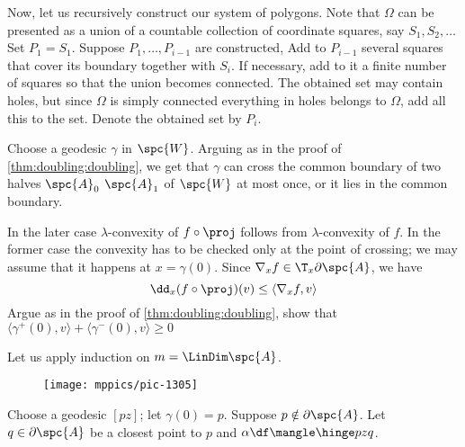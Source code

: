 Now, let us recursively construct our system of polygons.
Note that $\Omega$ can be presented as a union of a countable collection of coordinate squares, say $S_1,S_2,\dots$
Set $P_1=S_1$.
Suppose $P_1,\dots,P_{i-1}$ are constructed,
Add to $P_{i-1}$ several squares that cover its boundary together with $S_i$.
If necessary, add to it a finite number of squares so that the union becomes connected.
The obtained set may contain holes, but since $\Omega$ is simply connected everything in holes belongs to $\Omega$, add all this to the set.
Denote the obtained set by $P_i$.






















Choose a geodesic $\gamma$ in $\spc{W}$.
Arguing as in the proof of \ref{thm:doubling:doubling}, we get 
that $\gamma$ can cross the common boundary of two halves $\spc{A}_0$ $\spc{A}_1$ of $\spc{W}$ at most once, or it lies in the common boundary.

In the later case $\lambda$-convexity of $f\circ\proj$ follows from $\lambda$-convexity of $f$.
In the former case the convexity has to be checked only at the point of crossing;
we may assume that it happens at $x=\gamma(0)$.
Since $\nabla_x f\in \T_x\partial\spc{A}$, we have 
\[\dd_x(f\circ\proj)(v)\le\langle\nabla_x f,v\rangle\]
Argue as in the proof of \ref{thm:doubling:doubling}, show that 
$\langle\gamma^+(0),v\rangle+\langle\gamma^-(0),v\rangle \ge 0$
















Let us apply induction on $m=\LinDim \spc{A}$.

\begin{wrapfigure}{r}{30mm}
\vskip-2mm
\centering
\texttt{[image: mppics/pic-1305]}
\end{wrapfigure}

Choose a geodesic $[pz]$; let $\gamma(0)=p$.
Suppose $p\notin\partial \spc{A}$.
Let $q\in \partial\spc{A}$ be a closest point to $p$ and $\alpha\df\mangle\hinge pzq$.

